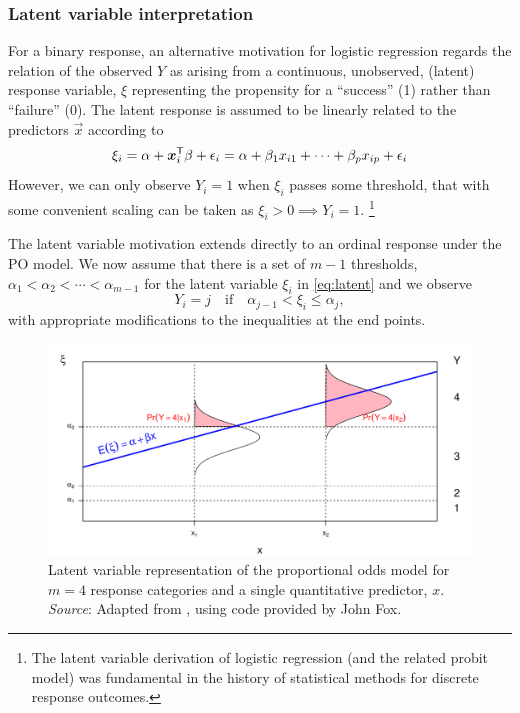 \documentclass[11pt]{book}\usepackage[]{graphicx}\usepackage[]{color}
\begin{document}
\subsubsection{Latent variable interpretation}
For a binary response, an alternative motivation for logistic regression
regards the relation of the observed $Y$ as arising from a continuous, unobserved,
(latent) response variable, $\xi$ representing the propensity for a
``success'' (1) rather than ``failure'' (0).  
The latent response is assumed to be linearly related to the predictors $\vec{x}$
according to 
\begin{equation}\label{eq:latent}
 \xi_i = \alpha + \bm{x}_i ^\mathsf{T} \beta + \epsilon_i 
        = \alpha + \beta_1 x_{i1} + \cdots + \beta_p x_{ip} + \epsilon_i
\end{equation}
However, we can only observe $Y_i =1$ when $\xi_i$ passes some threshold,
that with some convenient scaling can be taken as
$\xi_i > 0 \implies Y_i=1$.%
\footnote{
The latent variable derivation of logistic regression (and the related probit model)
was fundamental in the history of statistical methods for discrete response outcomes.
}

The latent variable motivation extends directly to an ordinal response under the PO model. 
We now assume that there is a set of $m-1$ thresholds,
$\alpha_1 < \alpha_2 < \cdots < \alpha_{m-1}$ for the latent variable
$\xi_i$ in \eqref{eq:latent} and we observe
\begin{equation*}
  Y_i = j \quad \mbox{if} \quad \alpha_{j-1} < \xi_i \le \alpha_j \comma
\end{equation*}
with appropriate modifications to the inequalities at the end points.  


\begin{figure}
 \centering
 \includegraphics[width=.9\textwidth]{ch07/fig/latent}
 \caption{Latent variable representation of the proportional odds model for $m=4$ response categories and a single quantitative predictor, $x$.
 \emph{Source}: Adapted from \citet[Fig 14.10]{Fox:2008}, using code provided by John Fox.}
 \label{fig:latent}
\end{figure}
\end{document}
